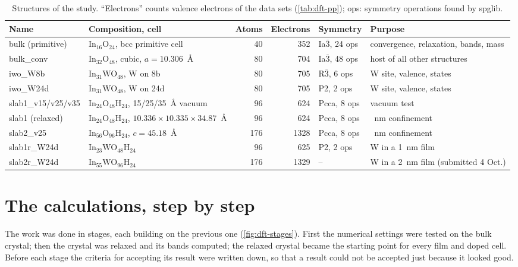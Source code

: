 \begin{table}[htbp]\centering\footnotesize
\caption{Structures of the study. ``Electrons'' counts valence electrons of the data sets (\cref{tab:dft-pp}); ops:
symmetry operations found by spglib.}
\label{tab:dft-structures}
\begin{tabularx}{\linewidth}{@{}l>{\raggedright\arraybackslash}Xrrl>{\raggedright\arraybackslash}p{3.6cm}@{}}
\toprule
Name & Composition, cell & Atoms & Electrons & Symmetry & Purpose \\
\midrule
bulk (primitive) & In$_{16}$O$_{24}$, bcc primitive cell & 40 & 352 & Ia$\bar{3}$, 24 ops & convergence, relaxation, bands, mass \\
bulk\_conv & In$_{32}$O$_{48}$, cubic, $a = 10.306$~\AA & 80 & 704 & Ia$\bar{3}$, 48 ops & host of all other structures \\
iwo\_W8b & In$_{31}$WO$_{48}$, W on 8b & 80 & 705 & R$\bar{3}$, 6 ops & W site, valence, states \\
iwo\_W24d & In$_{31}$WO$_{48}$, W on 24d & 80 & 705 & P2, 2 ops & W site, valence, states \\
slab1\_v15/v25/v35 & In$_{24}$O$_{48}$H$_{24}$, 15/25/35~\AA{} vacuum & 96 & 624 & Pcca, 8 ops & vacuum test \\
slab1 (relaxed) & In$_{24}$O$_{48}$H$_{24}$, $10.336\times10.335\times34.87$~\AA & 96 & 624 & Pcca, 8 ops & 1~nm confinement \\
slab2\_v25 & In$_{56}$O$_{96}$H$_{24}$, $c = 45.18$~\AA & 176 & 1328 & Pcca, 8 ops & 2~nm confinement \\
slab1r\_W24d & In$_{23}$WO$_{48}$H$_{24}$ & 96 & 625 & P2, 2 ops & W in a 1~nm film \\
slab2r\_W24d & In$_{55}$WO$_{96}$H$_{24}$ & 176 & 1329 & -- & W in a 2~nm film (submitted 4 Oct.) \\
\bottomrule
\end{tabularx}
\end{table}

\section{The calculations, step by step}
\label{sec:dft-calcs}

\begin{dftplain}
The work was done in stages, each building on the previous one (\cref{fig:dft-stages}). First the numerical settings
were tested on the bulk crystal; then the crystal was relaxed and its bands computed; the relaxed crystal became the
starting point for every film and doped cell. Before each stage the criteria for accepting its result were written down,
so that a result could not be accepted just because it looked good.
\end{dftplain}

